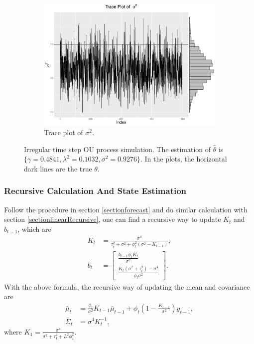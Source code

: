 \begin{figure}[h]
\begin{subfigure}[b]{0.3\textwidth}
    \includegraphics[width=\textwidth]{Chapters/05MCMCOU/plots/simudataOUtracesig2.pdf}
     \caption{Trace plot of $\sigma^2$.}
\end{subfigure}
\caption{Irregular time step OU process simulation. The estimation of $\hat{\theta}$ is $\{\gamma=0.4841, \lambda^2=0.1032, \sigma^2=0.9276\}$. In the plots, the horizontal dark lines are the true $\theta$. }
\label{simuOUmarginplots}
\end{figure}



\subsubsection*{Recursive Calculation And State Estimation}

Follow the procedure in section \ref{sectionforecast} and do similar calculation with section \ref{sectionlinearRecursive}, one can find a recursive way to update $K_{t}$ and $b_{t-1}$, which are 
\begin{align} \label{linearOUK}
K_{t}  &=\frac{\sigma^4}{\tau_t^2+\sigma^2+\phi_t^2(\sigma^2-K_{t-1})},\\
b_{t} &= \begin{bmatrix}
\frac{b_{t-1}\phi_t K_{t}}{\sigma^2} \\ \frac{K_{t}(\sigma^2+\tau_t^2)-\sigma^4 }{\phi_t\sigma^2}
\end{bmatrix}. 
\end{align}
With the above formula, the recursive way of updating the mean and covariance are 
\begin{align} \label{linearOUmu}
\bar{\mu}_{t}       & = \frac{\phi_t}{\sigma^2}K_{t-1}\bar{\mu}_{t-1} + \phi_t (1 - \frac{K_{t-1}}{\sigma^2})y_{t-1}, \\
\bar{\Sigma}_{t}  &= \sigma^4K_{t}^{-1}, \label{linearOUsigma}
\end{align}
where $K_1=\frac{\sigma^4}{\sigma^2+\tau_1^2+L^2\phi_1^2}$. 

